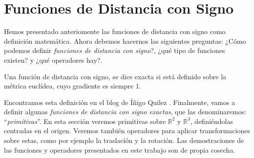 \chapter{Funciones de Distancia con Signo\label{ch:fds}}
Hemos presentado anteriomente las funciones de distancia con signo como definición matemática. Ahora debemos hacernos las siguientes preguntas: ¿Cómo podemos definir \textit{funciones de distancia con signo}?, ¿qué tipo de funciones existen? y ¿qué operadores hay?.

\begin{definition}
Una función de distancia con signo, se dice exacta si está definido sobre la métrica euclídea, cuyo gradiente es siempre \(1\).
\end{definition}

Encontramos esta definición en el blog de Íñigo Quilez \cite{3ddistinigo}. Finalmente,
 vamos a definir algunas \textit{funciones de distancia con signo exactas}, que las denominaremos: \enquote{\textit{primitivas}}. En esta sección veremos primitivas sobre \(\mathbb{R}^2 \text{ y }\mathbb{R}^3\), definiéndolas centradas en el origen. Veremos también operadores para aplicar transformaciones sobre estas, como por ejemplo la traslación y la rotación. Las demostraciones de las funciones y operadores presentados en este trabajo son de propia cosecha.

